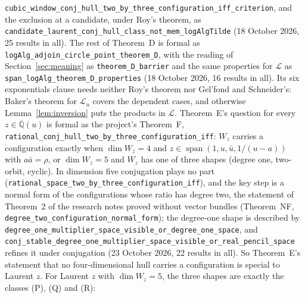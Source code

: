 \documentclass[11pt,a4paper]{article}
\theoremstyle{plain}
\theoremstyle{definition}
\newcommand{\Qbar}{\overline{\mathbb{Q}}}
\newcommand{\cL}{\mathcal{L}}
\newcommand{\spn}{\operatorname{span}}
\begin{document}
\begin{itemize}
\texttt{cubic\_\allowbreak{}window\_\allowbreak{}conj\_\allowbreak{}hull\_\allowbreak{}two\_\allowbreak{}by\_\allowbreak{}three\_\allowbreak{}configuration\_\allowbreak{}iff\_\allowbreak{}criterion}, and the exclusion at a candidate, under
Roy's theorem, as \texttt{candidate\_\allowbreak{}laurent\_\allowbreak{}conj\_\allowbreak{}hull\_\allowbreak{}class\_\allowbreak{}not\_\allowbreak{}mem\_\allowbreak{}logAlgTilde} (18 October 2026, 25 results in all).
The rest of Theorem~D is formal as \texttt{logAlg\_\allowbreak{}adjoin\_\allowbreak{}circle\_\allowbreak{}point\_\allowbreak{}theorem\_\allowbreak{}D}, with the reading of
Section~\ref{sec:meaning} as \texttt{theorem\_\allowbreak{}D\_\allowbreak{}barrier} and the same properties for $\cL$ as
\texttt{span\_\allowbreak{}logAlg\_\allowbreak{}theorem\_\allowbreak{}D\_\allowbreak{}properties} (18 October 2026, 16 results in all). Its six exponentials clause
needs neither Roy's theorem nor Gel'fond and Schneider's: Baker's theorem for $\cL_{u}$ covers the dependent
cases, and otherwise Lemma~\ref{lem:inversion} puts the products in $\cL$.
Theorem~E's question for every $z\in\Qbar(u)$ is formal as the project's Theorem~F,
\texttt{rational\_\allowbreak{}conj\_\allowbreak{}hull\_\allowbreak{}two\_\allowbreak{}by\_\allowbreak{}three\_\allowbreak{}configuration\_\allowbreak{}iff}: $W_{z}$ carries a configuration exactly when
$\dim W_{z}=4$ and $z\in\spn(1,u,\bar u,1/(u-a))$ with $a\bar a=\rho$, or $\dim W_{z}=5$ and $W_{z}$ has one of
three shapes (degree one, two-orbit, cyclic). In dimension five conjugation plays no part (\texttt{rational\_\allowbreak{}space\_\allowbreak{}two\_\allowbreak{}by\_\allowbreak{}three\_\allowbreak{}configuration\_\allowbreak{}iff}),
and the key step is a normal form of the configurations whose ratio has degree two, the statement of Theorem~2 of
the research notes proved without vector bundles (Theorem~NF, \texttt{degree\_\allowbreak{}two\_\allowbreak{}configuration\_\allowbreak{}normal\_\allowbreak{}form});
the degree-one shape is described by \texttt{degree\_\allowbreak{}one\_\allowbreak{}multiplier\_\allowbreak{}space\_\allowbreak{}visible\_\allowbreak{}or\_\allowbreak{}degree\_\allowbreak{}one\_\allowbreak{}space}, and \texttt{conj\_\allowbreak{}stable\_\allowbreak{}degree\_\allowbreak{}one\_\allowbreak{}multiplier\_\allowbreak{}space\_\allowbreak{}visible\_\allowbreak{}or\_\allowbreak{}real\_\allowbreak{}pencil\_\allowbreak{}space}
refines it under conjugation (23 October 2026, 22 results in all). So Theorem~E's statement that no four-dimensional hull
carries a configuration is special to Laurent $z$. For Laurent $z$ with $\dim W_{z}=5$, the three shapes are exactly the classes (P), (Q) and (R):

\end{itemize}
\end{document}

